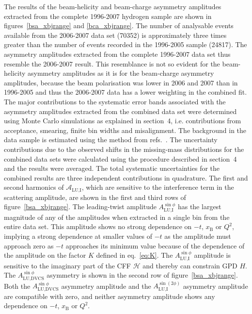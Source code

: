 The results of the beam-helicity and beam-charge asymmetry amplitudes extracted from the complete 1996-2007 hydrogen sample are shown in figures~\ref{bsa_xbjrange} and \ref{bca_xbjrange}. The number of analysable events available from the 2006-2007 data set (70352) is approximately three times greater than the number of events recorded in the 1996-2005 sample (24817). The  asymmetry amplitudes extracted from the complete 1996-2007 data set thus resemble the 2006-2007 result. This resemblance is not so evident for the beam-helicity asymmetry amplitudes as it is for the beam-charge asymmetry amplitudes, because the beam polarisation was lower in 2006 and 2007 than in 1996-2005 and thus the 2006-2007 data has a lower weighting in the combined fit. The major contributions to the systematic error bands associated with the asymmetry amplitudes extracted from the combined data set were determined using Monte Carlo simulations as explained in section~4, i.e. contributions from acceptance, smearing, finite bin widths and misalignment. The background in the  data sample is estimated using the method from refs.~\cite{Air08,Zei09, Bur10}. The uncertainty contributions due to the observed shifts in the missing-mass distributions for the combined data sets were calculated using the procedure described in section~4 and the results were averaged. The total systematic uncertainties for the combined results are  three independent contributions in quadrature.
The first and second harmonics of $\mathcal{A}_{\textrm{LU,I}}$, which are
sensitive to the interference term in the scattering amplitude, are shown in the first and third rows of figure~\ref{bsa_xbjrange}. The leading-twist amplitude $A_{\textrm{LU,I}}^{\sin\phi}$ has the largest magnitude of any of the amplitudes when extracted in a single bin from the entire data set. This amplitude shows no strong dependence on $-t$, $x_{\textrm{B}}$ or $Q^{2}$, implying a strong dependence at smaller values of $-t$ as the amplitude must approach zero as $-t$ approaches its minimum value because of the dependence of the amplitude on the factor $K$ defined in eq.~\ref{eq:K}. The $A_{\textrm{LU,I}}^{\sin\phi}$ amplitude is sensitive to the imaginary part of the CFF $\mathcal{H}$ and thereby can constrain GPD $\textit{H}$. The $A_{\textrm{LU,DVCS}}^{\sin\phi}$ asymmetry is shown in the second row of figure~\ref{bsa_xbjrange}. Both the $A_{\textrm{LU,DVCS}}^{\sin\phi}$ asymmetry amplitude and the $A_{\textrm{LU,I}}^{\sin(2\phi)}$ asymmetry amplitude are compatible with zero, and neither asymmetry amplitude shows any dependence on $-t$, $x_{\textrm{B}}$ or $Q^{2}$.

